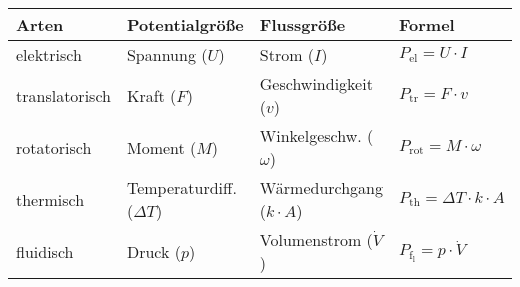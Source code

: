 \begin{frame}
		\begin{table}[H]
			\centering
			\begin{tabular}{|l|l|l|l|} %
				\hline
				\textbf{Arten} & \textbf{Potentialgröße} & \textbf{Flussgröße} & \textbf{Formel} \\ %
				\hline
				elektrisch & Spannung ($U$) & Strom ($I$) & $P_{\text{el}} = U \cdot I$ \\ %
				\hline
				translatorisch & Kraft ($F$)  & Geschwindigkeit ($v$) &  $P_{\text{tr}} = F \cdot v$ \\ %
				\hline
				rotatorisch & Moment ($M$)  & Winkelgeschw. ($\omega$) & $P_{\text{rot}} = M \cdot \omega$ \\ %
				\hline
				thermisch & Temperaturdiff. ($\Delta T$) & Wärmedurchgang ($k\cdot A $) & $P_{\text{th}} = \Delta T \cdot k \cdot A$ \\ %
				\hline
				fluidisch & Druck ($p$) & Volumenstrom ($\dot{V}$) & $P_\mathrm{f_{l}} = p \cdot \dot{V}$ \\ %
				\hline
			\end{tabular}
			\label{tab:groessen} %
		\end{table}
\end{frame}
